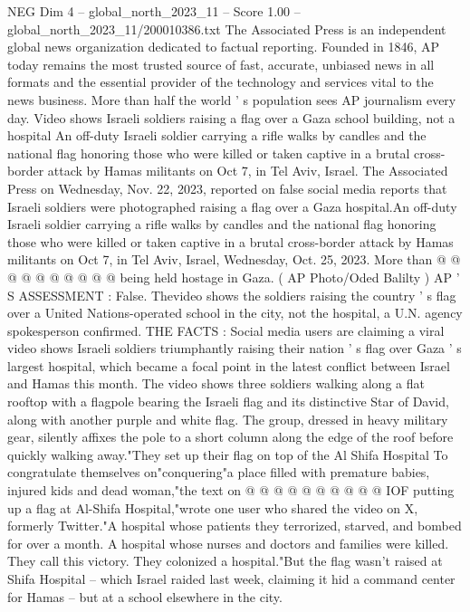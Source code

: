 \begin{textsample}{NEG Dim 4 – global\_north\_2023\_11 – Score 1.00 – global\_north\_2023\_11/200010386.txt}  \label{ex:f4_neg_252}
The Associated Press is an independent global news organization dedicated to factual reporting.
Founded in 1846, AP today remains the most trusted source of fast, accurate, unbiased news in all formats and the essential provider of the technology and services vital to the news business.
More than half the world ' s population sees AP journalism every day.
Video shows Israeli soldiers raising a flag over a Gaza school building, not a hospital An off-duty Israeli soldier carrying a rifle walks by candles and the national flag honoring those who were killed or taken captive in a brutal cross-border attack by Hamas militants on Oct 7, in Tel Aviv, Israel.
The Associated Press on Wednesday, Nov. 22, 2023, reported on false social media reports that Israeli soldiers were photographed raising a flag over a Gaza hospital.An off-duty Israeli soldier carrying a rifle walks by candles and the national flag honoring those who were killed or taken captive in a brutal cross-border attack by Hamas militants on Oct 7, in Tel Aviv, Israel, Wednesday, Oct. 25, 2023.
More than @ @ @ @ @ @ @ @ @ @ being held hostage in Gaza. ( AP Photo/Oded Balilty ) AP ' S ASSESSMENT : False.
Thevideo shows the soldiers raising the country ' s flag over a United Nations-operated school in the city, not the hospital, a U.N. agency spokesperson confirmed.
THE FACTS : Social media users are claiming a viral video shows Israeli soldiers triumphantly raising their nation ' s flag over Gaza ' s largest hospital, which became a focal point in the latest conflict between Israel and Hamas this month.
The video shows three soldiers walking along a flat rooftop with a flagpole bearing the Israeli flag and its distinctive Star of David, along with another purple and white flag.
The group, dressed in heavy military gear, silently affixes the pole to a short column along the edge of the roof before quickly walking away."They set up their flag on top of the Al Shifa Hospital To congratulate themselves on"conquering"a place filled with premature babies, injured kids and dead woman,"the text on @ @ @ @ @ @ @ @ @ @ IOF putting up a flag at Al-Shifa Hospital,"wrote one user who shared the video on X, formerly Twitter."A hospital whose patients they terrorized, starved, and bombed for over a month.
A hospital whose nurses and doctors and families were killed.
They call this victory.
They colonized a hospital."But the flag wasn't raised at Shifa Hospital -- which Israel raided last week, claiming it hid a command center for Hamas -- but at a school elsewhere in the city.

\end{textsample}
